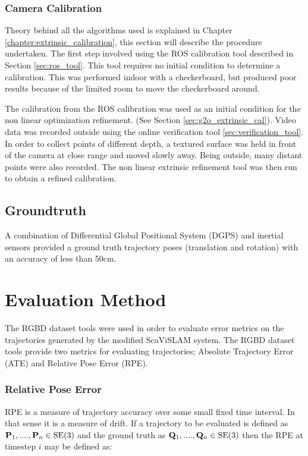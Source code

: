 \subsubsection{Camera Calibration}

Theory behind all the algorithms used is explained in Chapter \ref{chapter:extrinsic_calibration}, this section will describe the procedure undertaken.  The first step involved using the ROS calibration tool described in Section \ref{sec:ros_tool}.  This tool requires no initial condition to determine a calibration.  This was performed indoor with a checkerboard, but produced poor results because of the limited room to move the checkerboard around.

The calibration from the ROS calibration was used as an initial condition for the non linear optimization refinement. (See Section \ref{sec:g2o_extrinsic_cal}).  Video data was recorded outside using the online verification tool \ref{sec:verification_tool}.  In order to collect points of different depth, a textured surface was held in front of the camera at close range and moved slowly away.  Being outside, many distant points were also recorded.  The non linear extrinsic refinement tool was then run to obtain a refined calibration.   

\subsection{Groundtruth}

A combination of Differential Global Positional System (DGPS) and inertial sensors provided a ground truth trajectory poses (translation and rotation) with an accuracy of less than 50cm. 

\section{Evaluation Method}

The RGBD dataset tools\cite{sturm12iros} were used in order to evaluate error metrics on the trajectories generated by the modified ScaViSLAM system.  The RGBD dataset tools provide two metrics for evaluating trajectories; Absolute Trajectory Error (ATE) and Relative Pose Error (RPE).

\subsubsection{Relative Pose Error}

RPE is a measure of trajectory accuracy over some small fixed time interval.  In that sense it is a measure of drift.  If a trajectory to be evaluated is defined as $\mathbf P_1,....,\mathbf P_n \in \text{SE}(3)$ and the ground truth as $\mathbf Q_1,....,\mathbf Q_n \in \text{SE}(3)$ then the RPE at timestep $i$ may be defined as:

